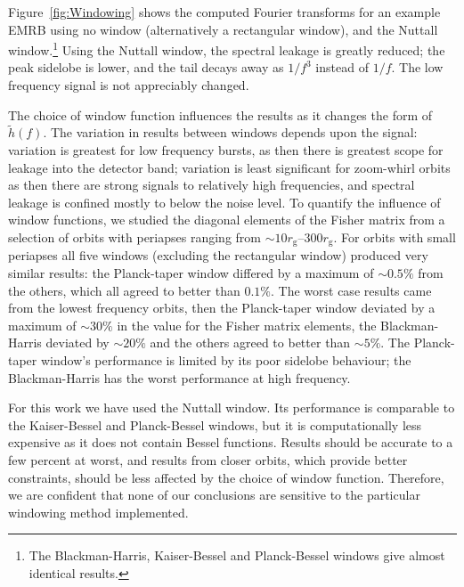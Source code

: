 \documentclass[useAMS,usedcolumn,usegraphicx,usenatbib]{mn2e}
\newcommand{\Figref}[1]{Figure~\ref{fig:#1}}
\newcommand{\sub}[1]{\ensuremath{_\mathrm{#1}}}
\begin{document}
\Figref{Windowing} shows the computed Fourier transforms for an example EMRB using no window (alternatively a rectangular window), and the Nuttall window.\footnote{The Blackman-Harris, Kaiser-Bessel and Planck-Bessel windows give almost identical results.} Using the Nuttall window, the spectral leakage is greatly reduced; the peak sidelobe is lower, and the tail decays away as $1/{f^3}$ instead of $1/{f}$. The low frequency signal is not appreciably changed.

The choice of window function influences the results as it changes the form of $\widetilde{h}(f)$. The variation in results between windows depends upon the signal: variation is greatest for low frequency bursts, as then there is greatest scope for leakage into the detector band; variation is least significant for zoom-whirl orbits as then there are strong signals to relatively high frequencies, and spectral leakage is confined mostly to below the noise level. To quantify the influence of window functions, we studied the diagonal elements of the Fisher matrix from a selection of orbits with periapses ranging from $\sim 10 r\sub{g}$--$300 r\sub{g}$. For orbits with small periapses all five windows (excluding the rectangular window) produced very similar results: the Planck-taper window differed by a maximum of $\sim 0.5\%$ from the others, which all agreed to better than $0.1\%$. The worst case results came from the lowest frequency orbits, then the Planck-taper window deviated by a maximum of $\sim 30\%$ in the value for the Fisher matrix elements, the Blackman-Harris deviated by $\sim 20\%$ and the others agreed to better than $\sim 5\%$. The Planck-taper window's performance is limited by its poor sidelobe behaviour; the Blackman-Harris has the worst performance at high frequency.

For this work we have used the Nuttall window. Its performance is comparable to the Kaiser-Bessel and Planck-Bessel windows, but it is computationally less expensive as it does not contain Bessel functions. Results should be accurate to a few percent at worst, and results from closer orbits, which provide better constraints, should be less affected by the choice of window function. Therefore, we are confident that none of our conclusions are sensitive to the particular windowing method implemented.

\bsp

\label{lastpage}
\end{document}

